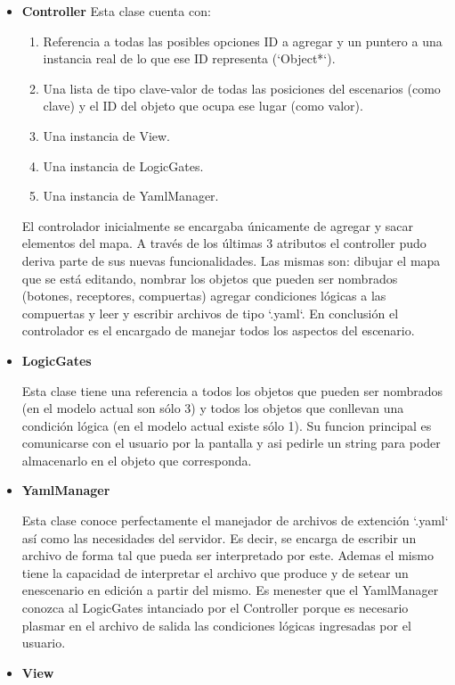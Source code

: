 \documentclass[a4paper]{article}
\begin{document}
\begin{itemize}
\item \textbf{Controller}
Esta clase cuenta con:
\begin{enumerate}
\item Referencia a todas las posibles opciones ID a agregar y un puntero a una instancia real de lo que ese ID representa (`Object*`).
\item Una lista de tipo clave-valor de todas las posiciones del escenarios (como clave) y el ID del objeto que ocupa ese lugar (como valor).
\item Una instancia de View.
\item Una instancia de LogicGates.
\item Una instancia de YamlManager.
\end{enumerate}

El controlador inicialmente se encargaba únicamente de agregar y sacar elementos del mapa. A través de los últimas 3 atributos el controller pudo deriva parte de sus nuevas funcionalidades. Las mismas son: dibujar el mapa que se está editando, nombrar los objetos que pueden ser nombrados (botones, receptores, compuertas) agregar condiciones lógicas a las compuertas y leer y escribir archivos de tipo `.yaml`. En conclusión el controlador es el encargado de manejar todos los aspectos del escenario.

\item \textbf{LogicGates}

Esta clase tiene una referencia a todos los objetos que pueden ser nombrados (en el modelo actual son sólo 3) y todos los objetos que conllevan una condición lógica (en el modelo actual existe sólo 1). Su funcion principal es comunicarse con el usuario por la pantalla y asi pedirle un string para poder almacenarlo en el objeto que corresponda.

\item \textbf{YamlManager}

Esta clase conoce perfectamente el manejador de archivos de extención `.yaml` así como las necesidades del servidor. Es decir, se encarga de escribir un archivo de forma tal que pueda ser interpretado por este. Ademas el mismo tiene la capacidad de interpretar el archivo que produce y de setear un enescenario en edición a partir del mismo. Es menester que el YamlManager conozca al LogicGates intanciado por el Controller porque es necesario plasmar en el archivo de salida las condiciones lógicas ingresadas por el usuario.


\item \textbf{View}


\end{itemize}
\end{document}
